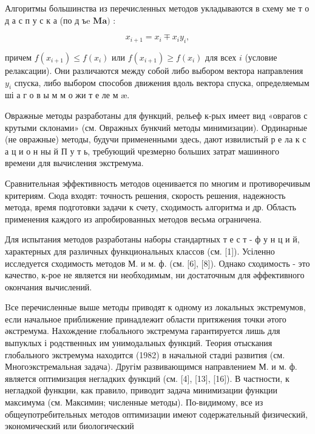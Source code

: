 \documentclass[10pt]{article}
\begin{document}
Алгоритмы большинства из перечисленных методов укладываются в схему ме т о д а с п у с к а (по д ъe $\mathbf{M} \mathbf{a})$ :



\[

x_{i+1}=x_{i} \mp x_{i} y_{i},

\]



причем $f\left(x_{i+1}\right) \leqslant f\left(x_{i}\right)$ или $f\left(x_{i+1}\right) \geqslant f\left(x_{i}\right)$ для всех $i$ (условие релаксации). Они различаются между собой либо выбором вектора направления $y_{i}$ спуска, либо выбором способов движения вдоль вектора спуска, определяемым ші а г о в ы м м о жи т е ле м æ.



Овражные методы разработаны для функций, рельеф к-рых имеет вид «оврагов с крутыми склонами» (см. Овражных бункчий методы минимизации). Ординарные (не овражные) методы, будучи примененными здесь, дают извилистый р е ла к с а ц и о н ны й П у т ь, требующий чрезмерно больших затрат машинного времени для вычисления экстремума.



Сравнительная эффективность методов оценивается по многим и противоречивым критериям. Сюда входят: точность решения, скорость решения, надежность метода, время подготовки задачи к счету, сходимость алгоритма и др. Область применения каждого из апробированных методов весьма ограничена.



Для испытания методов разработаны наборы стандартных т е с т - ф у н ц и й, характерных для различных функциональных классов (см. [1]). Усіленно исследуется сходимость методов М. и м. ф. (см. [6], [8]). Однако сходимость - это качество, к-рое не является ни необходимым, ни достаточным для әффективного окончания вычислений.



Bсе перечисленные выше методы приводят к одному из локальных экстремумов, если начальное приближение принадлежит области притяжения точки әтого әкстремума. Нахождение глобального экстремума гарантируется лишь для выпуклых і родственных им унимодальных функций. Теория отыскания глобального экстремума находится (1982) в начальной стадиі развития (см. Многоэкстремальная задача). Другім развивающимся направлением М. и м. ф. является оптимизация негладких функций (см. [4], [13], [16]). В частности, к негладкой функции, как правило, приводит задача минимизации функции максимума (см. Максимин; численные методы). По-видимому, все из общеупотребительных методов оптимизации имеют содержательный физический, экономический или биологический
\end{document}
